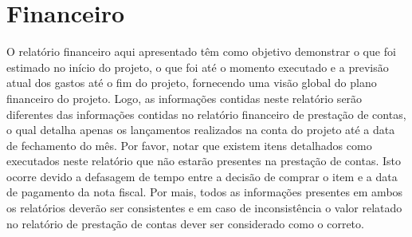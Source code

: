 



\section{Financeiro}
\label{financeiro}

O relatório financeiro aqui apresentado têm como objetivo demonstrar o que foi estimado no início do projeto, o que foi até o momento executado e a previsão atual dos gastos até o fim do projeto, fornecendo uma visão global do plano financeiro do projeto. Logo, as informações contidas neste  relatório serão diferentes das informações contidas no relatório financeiro de prestação de contas, o qual detalha apenas os lançamentos realizados na conta do projeto até a data de fechamento do mês. Por favor, notar que existem itens detalhados como executados neste relatório que não estarão presentes na prestação de contas. Isto ocorre devido a defasagem de tempo entre a decisão de comprar o item e a data de pagamento da nota fiscal. Por mais, todos as informações presentes em ambos os relatórios deverão ser consistentes e em caso de inconsistência o valor relatado no relatório de prestação de contas dever ser considerado como o correto.  
















